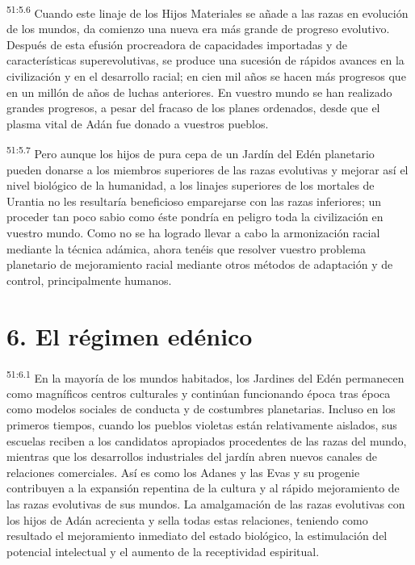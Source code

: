 \par
\textsuperscript{51:5.6} Cuando este linaje de los Hijos Materiales se añade a las razas en evolución de los mundos, da comienzo una nueva era más grande de progreso evolutivo. Después de esta efusión procreadora de capacidades importadas y de características superevolutivas, se produce una sucesión de rápidos avances en la civilización y en el desarrollo racial; en cien mil años se hacen más progresos que en un millón de años de luchas anteriores. En vuestro mundo se han realizado grandes progresos, a pesar del fracaso de los planes ordenados, desde que el plasma vital de Adán fue donado a vuestros pueblos.

\par
\textsuperscript{51:5.7} Pero aunque los hijos de pura cepa de un Jardín del Edén planetario pueden donarse a los miembros superiores de las razas evolutivas y mejorar así el nivel biológico de la humanidad, a los linajes superiores de los mortales de Urantia no les resultaría beneficioso emparejarse con las razas inferiores; un proceder tan poco sabio como éste pondría en peligro toda la civilización en vuestro mundo. Como no se ha logrado llevar a cabo la armonización racial mediante la técnica adámica, ahora tenéis que resolver vuestro problema planetario de mejoramiento racial mediante otros métodos de adaptación y de control, principalmente humanos.

\section*{6. El régimen edénico}
\par
\textsuperscript{51:6.1} En la mayoría de los mundos habitados, los Jardines del Edén permanecen como magníficos centros culturales y continúan funcionando época tras época como modelos sociales de conducta y de costumbres planetarias. Incluso en los primeros tiempos, cuando los pueblos violetas están relativamente aislados, sus escuelas reciben a los candidatos apropiados procedentes de las razas del mundo, mientras que los desarrollos industriales del jardín abren nuevos canales de relaciones comerciales. Así es como los Adanes y las Evas y su progenie contribuyen a la expansión repentina de la cultura y al rápido mejoramiento de las razas evolutivas de sus mundos. La amalgamación de las razas evolutivas con los hijos de Adán acrecienta y sella todas estas relaciones, teniendo como resultado el mejoramiento inmediato del estado biológico, la estimulación del potencial intelectual y el aumento de la receptividad espiritual.

